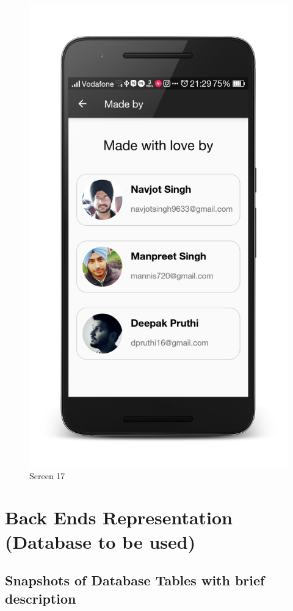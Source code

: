 \newpage
\begin{figure}[ht]
\centering
\includegraphics[scale=0.13]{images/d2.png}
\caption{Screen 17}
\end{figure}



\section{Back Ends Representation (Database to be used)}
\subsection{Snapshots of Database Tables with brief description}